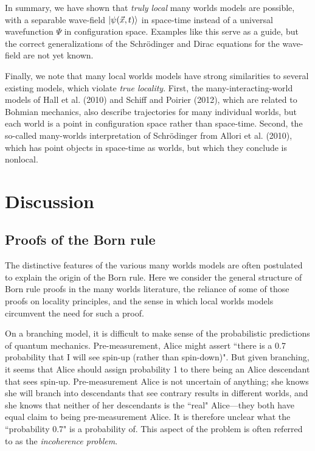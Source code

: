 \documentclass[a4paper]{article}
\begin{document}
In summary, we have shown that \textit{truly local} many worlds models are possible, with a separable wave-field $\Ket{\psi(\vec{x},t)}$ in space-time instead of a universal wavefunction $\Psi$ in configuration space.  Examples like this serve as a guide, but the correct generalizations of the Schr\"{o}dinger and Dirac equations for the wave-field are not yet known.

Finally, we note that many local worlds models have strong similarities to several existing models, which violate \textit{true locality}.  First, the many-interacting-world models of Hall et al. (2010) and Schiff and Poirier (2012), which are related to Bohmian mechanics, also describe trajectories for many individual worlds, but each world is a point in configuration space rather than space-time.  Second, the so-called many-worlds interpretation of Schr\"{o}dinger from Allori et al. (2010), which has point objects in space-time as worlds, but which they conclude is nonlocal. 



\section{Discussion}  \label{Discussion}

\subsection{Proofs of the Born rule}\label{Born}

The distinctive features of the various many worlds models are often postulated to explain the origin of the Born rule. Here we consider the general structure of Born rule proofs in the many worlds literature, the reliance of some of those proofs on locality principles, and the sense in which local worlds models circumvent the need for such a proof.

On a branching model, it is difficult to make sense of the probabilistic predictions of quantum mechanics. Pre-measurement, Alice might assert ``there is a 0.7 probability that I will see spin-up (rather than spin-down)". But given branching, it seems that Alice should assign probability 1 to there being an Alice descendant that sees spin-up. Pre-measurement Alice is not uncertain of anything; she knows she will branch into descendants that see contrary results in different worlds, and she knows that neither of her descendants is the ``real" Alice---they both have equal claim to being pre-measurement Alice. It is therefore unclear what the ``probability 0.7" is a probability of. This aspect of the problem is often referred to as the \textit{incoherence problem}. 
\end{document}
